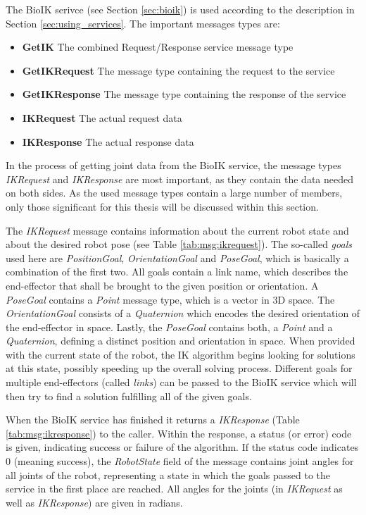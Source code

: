 The BioIK serivce (see Section \ref{sec:bioik}) is used according to the description in Section \ref{sec:using_services}. The important messages types are:
\begin{itemize}
	\item \textbf{GetIK} The combined Request/Response service message type
	\item \textbf{GetIKRequest} The message type containing the request to the service
	\item \textbf{GetIKResponse} The message type containing the response of the service
	\item \textbf{IKRequest} The actual request data
	\item \textbf{IKResponse} The actual response data
\end{itemize}

In the process of getting joint data from the BioIK service, the message types \textit{IKRequest} and \textit{IKResponse} are most important, as they contain the data needed on both sides. As the used message types contain a large number of members, only those significant for this thesis will be discussed within this section.

The \textit{IKRequest} message contains information about the current robot state and about the desired robot pose (see Table \ref{tab:msg:ikrequest}). The so-called \textit{goals} used here are \textit{PositionGoal}, \textit{OrientationGoal} and \textit{PoseGoal}, which is basically a combination of the first two. All goals contain a link name, which describes the end-effector that shall be brought to the given position or orientation. A \textit{PoseGoal} contains a \textit{Point} message type, which is a vector in 3D space. The \textit{OrientationGoal} consists of a \textit{Quaternion} which encodes the desired orientation of the end-effector in space. Lastly, the \textit{PoseGoal} contains both, a \textit{Point} and a \textit{Quaternion}, defining a distinct position and orientation in space. When provided with the current state of the robot, the IK algorithm begins looking for solutions at this state, possibly speeding up the overall solving process. Different goals for multiple end-effectors (called \textit{links}) can be passed to the BioIK service which will then try to find a solution fulfilling all of the given goals.

When the BioIK service has finished it returns a \textit{IKResponse} (Table \ref{tab:msg:ikresponse}) to the caller. Within the response, a status (or error) code is given, indicating success or failure of the algorithm. If the status code indicates 0 (meaning success), the \textit{RobotState} field of the message contains joint angles for all joints of the robot, representing a state in which the goals passed to the service in the first place are reached. All angles for the joints (in \textit{IKRequest} as well as \textit{IKResponse}) are given in radians.

